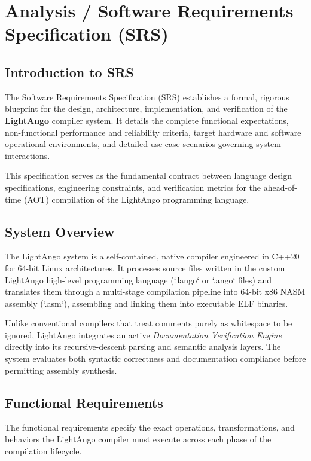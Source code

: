 \chapter{Analysis / Software Requirements Specification (SRS)}\doublespacing

\section{Introduction to SRS}
The Software Requirements Specification (SRS) establishes a formal, rigorous blueprint for the design, architecture, implementation, and verification of the \textbf{LightAngo} compiler system. It details the complete functional expectations, non-functional performance and reliability criteria, target hardware and software operational environments, and detailed use case scenarios governing system interactions.

This specification serves as the fundamental contract between language design specifications, engineering constraints, and verification metrics for the ahead-of-time (AOT) compilation of the LightAngo programming language.

\section{System Overview}
The LightAngo system is a self-contained, native compiler engineered in C++20 for 64-bit Linux architectures. It processes source files written in the custom LightAngo high-level programming language (`.lango` or `.ango` files) and translates them through a multi-stage compilation pipeline into 64-bit x86 NASM assembly (`.asm`), assembling and linking them into executable ELF binaries.

Unlike conventional compilers that treat comments purely as whitespace to be ignored, LightAngo integrates an active \textit{Documentation Verification Engine} directly into its recursive-descent parsing and semantic analysis layers. The system evaluates both syntactic correctness and documentation compliance before permitting assembly synthesis.

\section{Functional Requirements}
The functional requirements specify the exact operations, transformations, and behaviors the LightAngo compiler must execute across each phase of the compilation lifecycle.


